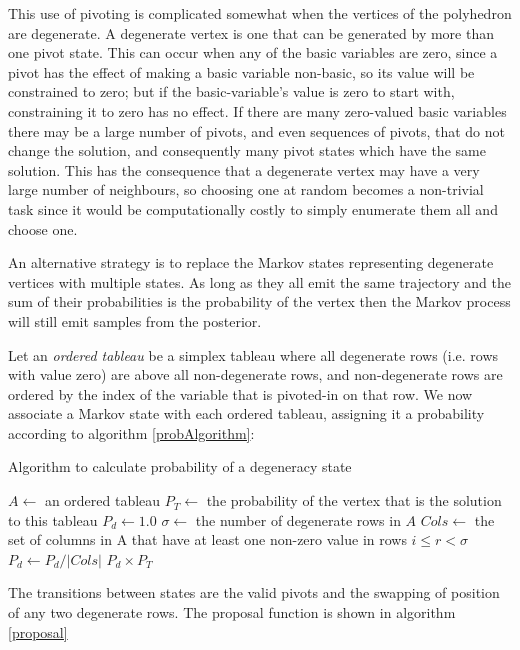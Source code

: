 \documentclass{article}
\begin{document}
This use of pivoting is complicated somewhat when the vertices of the polyhedron are degenerate. A degenerate vertex is one that can be generated by more than one pivot state. This can occur when any of the basic variables are zero, since a pivot has the effect of making a basic variable non-basic, so its value will be constrained to zero; but if the basic-variable's value is zero to start with, constraining it to zero has no effect. If there are many zero-valued basic variables there may be a large number of pivots, and even sequences of pivots, that do not change the solution, and consequently many pivot states which have the same solution. This has the consequence that a degenerate vertex may have a very large number of neighbours, so choosing one at random becomes a non-trivial task since it would be computationally costly to simply enumerate them all and choose one\cite{gal1992new}\cite{yamada1994enumerating}.

An alternative strategy is to replace the Markov states representing degenerate vertices with multiple states. As long as they all emit the same trajectory and the sum of their probabilities is the probability of the vertex then the Markov process will still emit samples from the posterior.

Let an \textit{ordered tableau} be a simplex tableau where all degenerate rows (i.e. rows with value zero) are above all non-degenerate rows, and non-degenerate rows are ordered by the index of the variable that is pivoted-in on that row. We now associate a Markov state with each ordered tableau, assigning it a probability according to algorithm \ref{probAlgorithm}:

\begin{algorithm}
\caption{Algorithm to calculate probability of a degeneracy state}
\label{probAlgorithm}
\begin{algorithmic}
\State $A \leftarrow$ an ordered tableau
\State $P_T \leftarrow$ the probability of the vertex that is the solution to this tableau
\State $P_d \leftarrow 1.0$
\State $\sigma \leftarrow$ the number of degenerate rows in $A$
	\State $Cols \leftarrow$ the set of columns in A that have at least one non-zero value in rows $i \le r < \sigma$
	\State $P_d \leftarrow P_d/|Cols|$
\EndFor
\State \Return $P_d \times P_T$
\end{algorithmic}
\end{algorithm}

The transitions between states are the valid pivots and the swapping of position of any two degenerate rows. The proposal function is shown in algorithm \ref{proposal}
\end{document}

